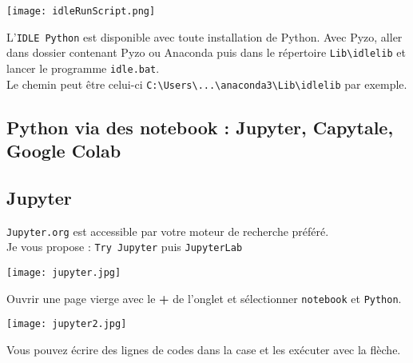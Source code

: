 \begin{center}
\texttt{[image: idleRunScript.png]}
\end{center}


L'\texttt{IDLE Python} est disponible avec toute installation de Python. Avec Pyzo, aller dans dossier contenant Pyzo ou Anaconda puis dans le répertoire \texttt{Lib\textbackslash idlelib} et lancer le programme \texttt{idle.bat}.\\
Le chemin peut être celui-ci \texttt{C:\textbackslash Users\textbackslash ...\textbackslash anaconda3\textbackslash Lib\textbackslash idlelib} par exemple.

\subsection{Python via des notebook : Jupyter, Capytale, Google Colab}

\subsection{Jupyter}
\texttt{Jupyter.org} est accessible par votre moteur de recherche préféré.\\
Je vous propose : \texttt{Try Jupyter} puis \texttt{JupyterLab}

\begin{center}
\texttt{[image: jupyter.jpg]}
\end{center}

Ouvrir une page vierge avec le \textbf{+} de l'onglet et sélectionner \texttt{notebook} et \texttt{Python}.


\begin{center}
\texttt{[image: jupyter2.jpg]}
\end{center}

Vous pouvez écrire des lignes de codes dans la case et les exécuter avec la flèche.


